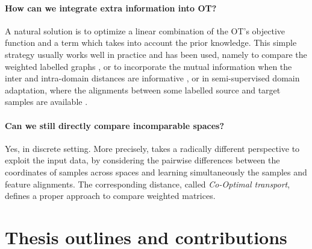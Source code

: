 \paragraph{How can we integrate extra information into OT?} A natural solution is to optimize
a linear combination of the OT's objective function and a term which takes into account the
prior knowledge. This simple strategy usually works well in practice and has been used, namely to
compare the weighted labelled graphs \citep{Vayer19b}, or to incorporate the mutual information
when the inter and intra-domain distances are informative \citep{Chuang23},
or in semi-supervised domain adaptation, where the alignments between some labelled source
and target samples are available \citep{Gu22}.


\paragraph{Can we still \textbf{directly} compare \textbf{incomparable spaces}?} Yes,
in discrete setting. More precisely, \citep{Redko20} takes a radically different perspective
to exploit the input data, by considering the pairwise differences between the coordinates
of samples across spaces and learning simultaneously the samples and feature alignments.
The corresponding distance, called \textit{Co-Optimal transport}, defines a proper approach
to compare weighted matrices.

\section{Thesis outlines and contributions}

